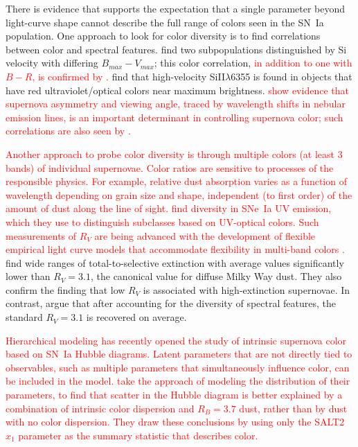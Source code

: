 \documentclass{aastex61}   	%
\begin{document}
There is evidence that supports the expectation that a single parameter beyond light-curve shape  cannot describe the full range
of colors seen in the SN~Ia population.  One approach to look for color diversity is to find correlations between color and spectral features.
\citet{2009ApJ...699L.139W, 2011ApJ...729...55F} find two subpopulations distinguished
by Si velocity with differing $B_{max}-V_{max}$; this color correlation, \textcolor{red}{ in addition to one with $B-R$, is confirmed by
\citet{2014ApJ...797...75M}.
}
\citet{2015MNRAS.451.1973S}
find that high-velocity SiII$\lambda$6355 is found in objects that have red ultraviolet/optical colors near maximum brightness.
\textcolor{red}{
\citet{2011MNRAS.413.3075M} show evidence that supernova asymmetry and viewing angle,
traced by wavelength shifts in nebular emission lines, is an important determinant in controlling supernova color; such correlations are also seen by \citet{2011A&A...534L..15C}.
}

\textcolor{red}{
Another approach to probe color diversity is through multiple colors (at least 3 bands)
of individual supernovae.  Color ratios are sensitive to processes of the responsible physics.   For example,
relative dust absorption varies as a function of wavelength depending on grain size and shape,
independent (to first order) of the amount of dust along the line of sight.
\citet{2013ApJ...779...23M} find diversity in SNe~Ia UV emission, which they use to distinguish subclasses based on UV-optical colors.}
\textcolor{red}{
Such measurements of $R_V$ are being advanced with the development of flexible empirical light curve models that accommodate flexibility in multi-band colors
\citep[e.g.][]{2011ApJ...731..120M}.}
\citet{2014ApJ...789...32B, 2015MNRAS.453.3300A} find wide
ranges of total-to-selective extinction with average values significantly lower than $R_V = 3.1$,
the canonical value for diffuse Milky Way dust.
They also confirm the \citet{2011ApJ...731..120M, 2011ApJ...729...55F} finding that low $R_V$ is associated with high-extinction supernovae.
In contrast, \citet{2011A&A...529L...4C} argue that after accounting for the diversity of spectral features,
the standard $R_V=3.1$ is recovered on average.


\textcolor{red}
{
Hierarchical modeling has recently opened
the study of intrinsic supernova color based on SN~Ia Hubble diagrams. Latent parameters that are not directly tied to observables,
such as multiple parameters that simultaneously influence color, can be included in the model.
\citet{2016arXiv160904470M} take the approach of modeling the distribution of their parameters, to find that
scatter in the Hubble diagram is better explained by a combination of intrinsic color dispersion and
$R_B=3.7$ dust, rather than by dust with no color dispersion.
They draw these conclusions by using only the SALT2 $x_1$ parameter as the summary statistic that describes color.
}
\end{document}
